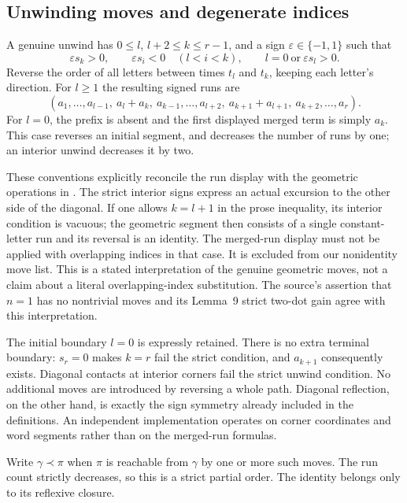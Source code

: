 \documentclass[11pt,a4paper]{article}
\begin{document}
\subsection{Unwinding moves and degenerate indices}
A genuine unwind has $0\leq l$, $l+2\leq k\leq r-1$, and a sign
$\varepsilon\in\{-1,1\}$ such that
\[
 \varepsilon s_k>0,\qquad
 \varepsilon s_i<0\quad(l<i<k),\qquad
 l=0\ \text{or}\ \varepsilon s_l>0.
\]
Reverse the order of all letters between times $t_l$ and $t_k$, keeping
each letter's direction. For $l\geq1$ the resulting signed runs are
\[
(a_1,\ldots,a_{l-1},\
a_l+a_k,\ a_{k-1},\ldots,a_{l+2},\
a_{k+1}+a_{l+1},\ a_{k+2},\ldots,a_r).
\]
For $l=0$, the prefix is absent and the first displayed merged term
is simply $a_k$. This case reverses an initial segment, and decreases
the number of runs by one; an interior unwind decreases it by two.

These conventions explicitly reconcile the run display with the
geometric operations in \cite[Section~2, Figures~3--4]{MN}. The strict
interior signs express an actual excursion to the other side of the
diagonal. If one allows $k=l+1$ in the prose inequality, its interior
condition is vacuous; the geometric segment then consists of a single
constant-letter run and its reversal is an identity. The merged-run
display must not be applied with overlapping indices in that case.
It is excluded from our nonidentity move list. This is a stated
interpretation of the genuine geometric moves, not a claim about a
literal overlapping-index substitution. The source's assertion that
$n=1$ has no nontrivial moves and its Lemma~9 strict two-dot gain agree
with this interpretation.

The initial boundary $l=0$ is expressly retained. There is no extra
terminal boundary: $s_r=0$ makes $k=r$ fail the strict condition, and
$a_{k+1}$ consequently exists. Diagonal contacts at interior corners
fail the strict unwind condition. No additional moves are introduced
by reversing a whole path. Diagonal reflection, on the other hand,
is exactly the sign symmetry already included in the definitions.
An independent implementation operates on corner coordinates and word
segments rather than on the merged-run formulas.

Write $\gamma\prec\pi$ when $\pi$ is reachable from $\gamma$ by one or
more such moves. The run count strictly decreases, so this is a strict
partial order. The identity belongs only to its reflexive closure.
\end{document}
